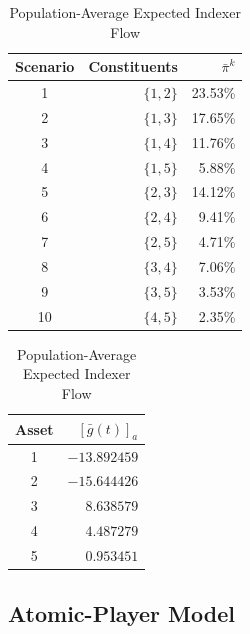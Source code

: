 \documentclass[12pt]{article}
\numberwithin{equation}{section}
\theoremstyle{definition}
\begin{document}
\begin{table}[H]
\centering
\begin{minipage}[t]{0.58\textwidth}
\centering
\captionsetup{justification=centering}
\caption{Post-Announcement Scenarios and Population-Average Belief}
\label{tab:experiment_scenarios}
\small
\begin{tabular}{crr}
\toprule
Scenario & Constituents & \(\bar\pi^k\) \\
\midrule
1  & \(\{1,2\}\) & 23.53\% \\
2  & \(\{1,3\}\) & 17.65\% \\
3  & \(\{1,4\}\) & 11.76\% \\
4  & \(\{1,5\}\) &  5.88\% \\
5  & \(\{2,3\}\) & 14.12\% \\
6  & \(\{2,4\}\) &  9.41\% \\
7  & \(\{2,5\}\) &  4.71\% \\
8  & \(\{3,4\}\) &  7.06\% \\
9  & \(\{3,5\}\) &  3.53\% \\
10 & \(\{4,5\}\) &  2.35\% \\
\bottomrule
\end{tabular}
\end{minipage}\hfill
\begin{minipage}[t]{0.36\textwidth}
\centering
\captionsetup{justification=centering}
\caption{Population-Average Expected Indexer Flow}
\label{tab:experiment_expected_flow}
\small
\begin{tabular}{cr}
\toprule
Asset & \([\bar g(t)]_a\) \\
\midrule
1 & \(-13.892459\) \\
2 & \(-15.644426\) \\
3 & \( 8.638579\) \\
4 & \( 4.487279\) \\
5 & \( 0.953451\) \\
\bottomrule
\end{tabular}
\par\vspace{0.5\baselineskip}
\footnotesize
\raggedright
\end{minipage}
\end{table}

\subsection{Atomic-Player Model}\label{sec:experiments_finite_player}

\begingroup
\renewcommand{\floatpagefraction}{0.85}
\end{document}
